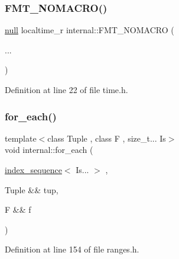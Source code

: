\subsubsection{\texorpdfstring{F\+M\+T\+\_\+\+N\+O\+M\+A\+C\+R\+O()}{FMT\_NOMACRO()}}
{\footnotesize\ttfamily \hyperlink{structinternal_1_1null}{null} localtime\+\_\+r internal\+::\+F\+M\+T\+\_\+\+N\+O\+M\+A\+C\+RO (\begin{DoxyParamCaption}\item[{}]{... }\end{DoxyParamCaption})\hspace{0.3cm}{\ttfamily [inline]}}



Definition at line 22 of file time.\+h.

\mbox{\label{namespaceinternal_a135f5624f6539777a653836901ec2e9a}} 
\subsubsection{\texorpdfstring{for\+\_\+each()}{for\_each()}\hspace{0.1cm}{\footnotesize\ttfamily [1/2]}}
{\footnotesize\ttfamily template$<$class Tuple , class F , size\+\_\+t... Is$>$ \\
void internal\+::for\+\_\+each (\begin{DoxyParamCaption}\item[{\hyperlink{namespaceinternal_a934b7952794e1164012436fcd82abb6b}{index\+\_\+sequence}$<$ Is... $>$}]{,  }\item[{Tuple \&\&}]{tup,  }\item[{F \&\&}]{f }\end{DoxyParamCaption})}



Definition at line 154 of file ranges.\+h.

